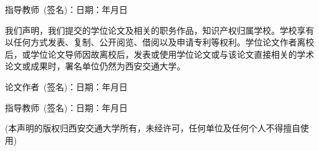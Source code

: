 \vspace{1em}
指导教师~(签名)：\hfill 日期：\hspace{4em}年\hspace{2em}月\hspace{2em}日\hspace{4em}



\vspace{1em}
\begin{center}\end{center}

我们声明，我们提交的学位论文及相关的职务作品，知识产权归属学校。学校享有以任何方式发表、复制、公开阅览、借阅以及申请专利等权利。学位论文作者离校后，或学位论文导师因故离校后，发表或使用学位论文或与该论文直接相关的学术论文或成果时，署名单位仍然为西安交通大学。

\vspace{1em}
论文作者~(签名)：\hfill 日期：\hspace{4em}年\hspace{2em}月\hspace{2em}日\hspace{4em}

指导教师~(签名)：\hfill 日期：\hspace{4em}年\hspace{2em}月\hspace{2em}日\hspace{4em}

\vspace{2em}
\noindent (本声明的版权归西安交通大学所有，未经许可，任何单位及任何个人不得擅自使用)
